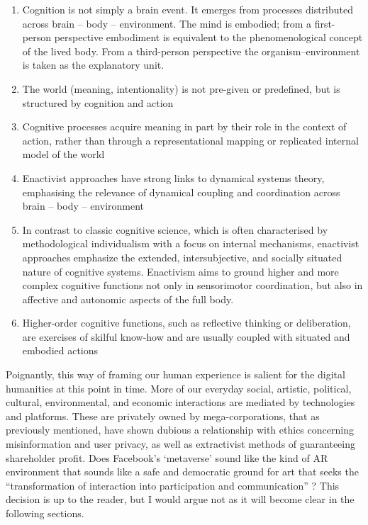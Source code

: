 \begin{enumerate}
    \item Cognition is not simply a brain event. It emerges from processes distributed across brain – body – environment. The mind is embodied; from a first-person perspective embodiment is equivalent to the phenomenological concept of the lived body. From a third-person perspective the organism–environment is taken as the explanatory unit.
    \item The world (meaning, intentionality) is not pre-given or predefined, but is structured by cognition and action
    \item Cognitive processes acquire meaning in part by their role in the context of action, rather than through a representational mapping or replicated internal model of the world
    \item Enactivist approaches have strong links to dynamical systems theory, emphasising the relevance of dynamical coupling and coordination across brain – body – environment
    \item In contrast to classic cognitive science, which is often characterised by methodological individualism with a focus on internal mechanisms, enactivist approaches emphasize the extended, intersubjective, and socially situated nature of cognitive systems. Enactivism aims to ground higher and more complex cognitive functions not only in sensorimotor coordination, but also in affective and autonomic aspects of the full body.
    \item Higher-order cognitive functions, such as reflective thinking or deliberation, are exercises of skilful know-how and are usually coupled with situated and embodied actions
\end{enumerate}
Poignantly, this way of framing our human experience is salient for the digital humanities at this point in time. More of our everyday social, artistic, political, cultural, environmental, and economic interactions are mediated by technologies and platforms. These are privately owned by mega-corporations, that as previously mentioned, have shown dubious a relationship with ethics concerning misinformation and user privacy, as well as extractivist methods of guaranteeing shareholder profit. Does Facebook’s ‘metaverse’ sound like the kind of AR environment that sounds like a safe and democratic ground for art that seeks the “transformation of interaction into participation and communication” \citep[]{dewey1934}? This decision is up to the reader, but I would argue not as it will become clear in the following sections.

